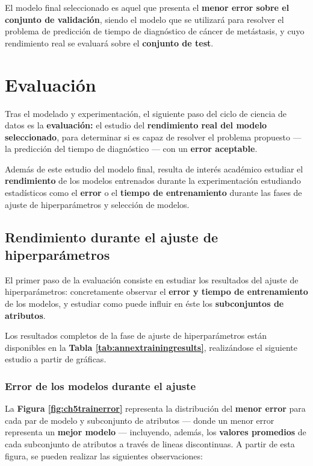 El modelo final seleccionado es aquel que presenta el \textbf{menor error sobre el conjunto de validación}, siendo el modelo que se utilizará para resolver el problema de predicción de tiempo de diagnóstico de cáncer de metástasis, y cuyo rendimiento real se evaluará sobre el \textbf{conjunto de test}.

\section{Evaluación}

Tras el modelado y experimentación, el siguiente paso del ciclo de ciencia de datos es la \textbf{evaluación:} el estudio del \textbf{rendimiento real del modelo seleccionado}, para determinar si es capaz de resolver el problema propuesto --- la predicción del tiempo de diagnóstico --- con un \textbf{error aceptable}.

Además de este estudio del modelo final, resulta de interés académico estudiar el \textbf{rendimiento} de los modelos entrenados durante la experimentación estudiando estadísticos como el \textbf{error} o el \textbf{tiempo de entrenamiento} durante las fases de ajuste de hiperparámetros y selección de modelos.

\subsection{Rendimiento durante el ajuste de hiperparámetros}

El primer paso de la evaluación consiste en estudiar los resultados del ajuste de hiperparámetros: concretamente observar el \textbf{error y tiempo de entrenamiento} de los modelos, y estudiar como puede influir en éste los \textbf{subconjuntos de atributos}.

Los resultados completos de la fase de ajuste de hiperparámetros están disponibles en la \textbf{Tabla \ref{tab:annextrainingresults}}, realizándose el siguiente estudio a partir de gráficas.

\subsubsection{Error de los modelos durante el ajuste}

La \textbf{Figura \ref{fig:ch5trainerror}} representa la distribución del \textbf{menor error} para cada par de modelo y subconjunto de atributos --- donde un menor error representa un \textbf{mejor modelo} --- incluyendo, además, los \textbf{valores promedios} de cada subconjunto de atributos a través de lineas discontinuas. A partir de esta figura, se pueden realizar las siguientes observaciones:

